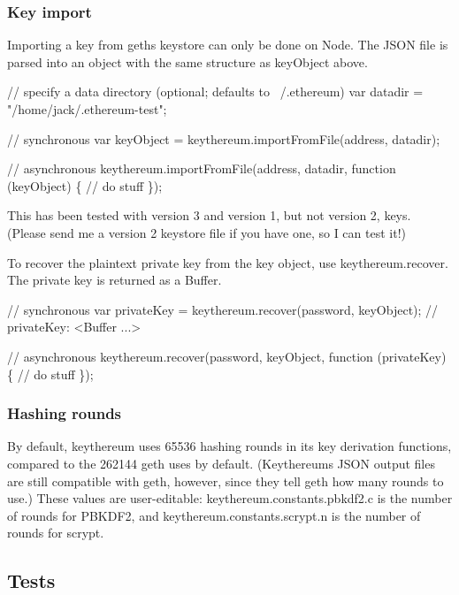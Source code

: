\subsubsection*{Key import}

Importing a key from geth\textquotesingle{}s keystore can only be done on Node. The J\+S\+ON file is parsed into an object with the same structure as {\ttfamily key\+Object} above. 
\begin{DoxyCode}
// specify a data directory (optional; defaults to ~/.ethereum)
var datadir = "/home/jack/.ethereum-test";

// synchronous
var keyObject = keythereum.importFromFile(address, datadir);

// asynchronous
keythereum.importFromFile(address, datadir, function (keyObject) \{
    // do stuff
\});
\end{DoxyCode}
 This has been tested with version 3 and version 1, but not version 2, keys. (Please send me a version 2 keystore file if you have one, so I can test it!)

To recover the plaintext private key from the key object, use {\ttfamily keythereum.\+recover}. The private key is returned as a Buffer. 
\begin{DoxyCode}
// synchronous
var privateKey = keythereum.recover(password, keyObject);
// privateKey:
<Buffer ...>

// asynchronous
keythereum.recover(password, keyObject, function (privateKey) \{
    // do stuff
\});
\end{DoxyCode}


\subsubsection*{Hashing rounds}

By default, keythereum uses 65536 hashing rounds in its key derivation functions, compared to the 262144 geth uses by default. (Keythereum\textquotesingle{}s J\+S\+ON output files are still compatible with geth, however, since they tell geth how many rounds to use.) These values are user-\/editable\+: {\ttfamily keythereum.\+constants.\+pbkdf2.\+c} is the number of rounds for P\+B\+K\+D\+F2, and {\ttfamily keythereum.\+constants.\+scrypt.\+n} is the number of rounds for scrypt.

\subsection*{Tests }

